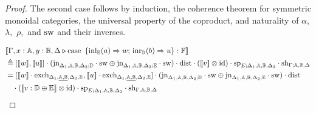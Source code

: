 \documentclass[10pt,a4paper]{amsart}
\theoremstyle{definition}
\theoremstyle{definition}
\theoremstyle{definition}
\theoremstyle{definition}
\theoremstyle{definition}
\theoremstyle{definition}
\begin{document}
\begin{proof}
The second case follows by induction, the coherence theorem for symmetric monoidal categories, the universal property of the coproduct, and naturality of $\alpha,$ $\lambda,$ $\rho,$ and $\mathrm{sw}$ and their inverses.


\begin{align*}
  & [\![\Gamma,x:\typeA, y:\typeB, \Delta \vljud \text{case } \,  \{\text{inl}_{\typeE} (a) \Rightarrow w ;\, \text{inr}_{\typeD} (b) \Rightarrow u\}: \typeF]\!] \\
  & \triangleq   \left[[\![ w ]\!] ,[\![ u ]\!]\right] \comp (\text{jn}_{\Delta_{1},\typeA,\typeB,  \Delta_{2};\typeD}\comp \sw \oplus \text{jn}_{\Delta_{1},\typeA,\typeB,  \Delta_{2};\typeE} \comp \sw) \comp \dist \comp ([\![v]\!] \otimes \text{id}) \comp \text{sp}_{E; \Delta_{1},\typeA,\typeB,  \Delta_{2}} \comp \text{sh}_{\Gamma;\typeA, \typeB,\Delta}  \\
  & = [[\![ w ]\!]  \comp \text{exch}_{\Delta_{1},\underline{\typeA,\typeB},  \Delta_{2},\typeD},    [\![u ]\!] \comp \text{exch}_{\Delta_{1},\underline{\typeA,\typeB},  \Delta_{2},\typeE} ] \comp (\text{jn}_{\Delta_{1},\typeA,\typeB,  \Delta_{2};\typeD}\comp \sw \oplus \text{jn}_{\Delta_{1},\typeA,\typeB,  \Delta_{2};\typeE} \comp \sw) \comp \dist \\
  & \hspace{10pt} \comp ([\![  v : \typeD \oplus \typeE  ]\!] \otimes \text{id}) \comp\text{sp}_{E; \Delta_{1},\typeA,\typeB,  \Delta_{2}} \comp \text{sh}_{\Gamma,\typeA, \typeB,\Delta} \\

\end{align*}
\end{proof}
\end{document}
